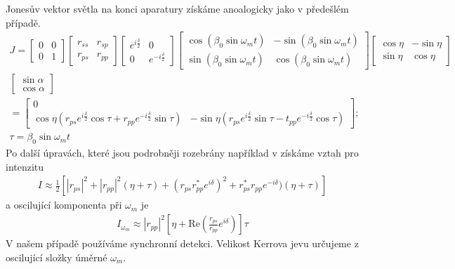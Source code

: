 Jonesův vektor světla na konci aparatury získáme anoalogicky jako v předešlém případě.
\begin{eqnarray}
J=\begin{bmatrix}0&0\\0&1\end{bmatrix}
\begin{bmatrix}r_{ss}&r_{sp}\\r_{ps}& r_{pp}\end{bmatrix}
\begin{bmatrix}e^{i\frac{\delta}{2}}&0\\0&e^{-i\frac{\delta}{2}}\end{bmatrix}
\begin{bmatrix}\cos(\beta_0\sin\omega_mt) & -\sin(\beta_0\sin\omega_mt) \\ \sin(\beta_0\sin\omega_mt)&\cos(\beta_0\sin\omega_mt)\end{bmatrix}
\begin{bmatrix}\cos\eta&-\sin\eta\\\sin\eta&\cos\eta\end{bmatrix} \\
\begin{bmatrix}\sin\alpha\\\cos\alpha\end{bmatrix} \\
=\begin{bmatrix}0\\\cos\eta(r_{ps}e^{i\frac{\delta}{2}}\cos\tau+r_{pp}e^{-i\frac{\delta}{2}}\sin\tau)& -\sin\eta(r_{ps}e^{i\frac{\delta}{2}}\sin\tau-t_{pp}e^{-i\frac{\delta}{2}}\cos\tau)\end{bmatrix};\\ \tau = \beta_0\sin\omega_mt
\end{eqnarray}
Po další úpravách, které jsou podrobněji rozebrány například v \cite{Nyvlt} získáme vztah pro intenzitu
\begin{eqnarray}
I\approx\frac{1}{2}\left[|r_{ps}|^2+|r_{pp}|^2(\eta+\tau)+(r_{ps}r^*_{pp}e^{i\delta})^2+r^*_{ps}r_{pp}e^{-i\delta})(\eta+\tau)\right]
\end{eqnarray}
a oscilující komponenta při $\omega_m$ je
\begin{eqnarray}
I_{\omega_m}\approx|r_{pp}|^2\left[\eta+\mbox{Re}\left(\frac{r_{ps}}{r_{pp}}e^{i\delta}\right)\right]\tau
\end{eqnarray}
V našem případě používáme synchronní detekci. Velikost Kerrova jevu určujeme z oscilující složky úměrné $\omega_m$.

